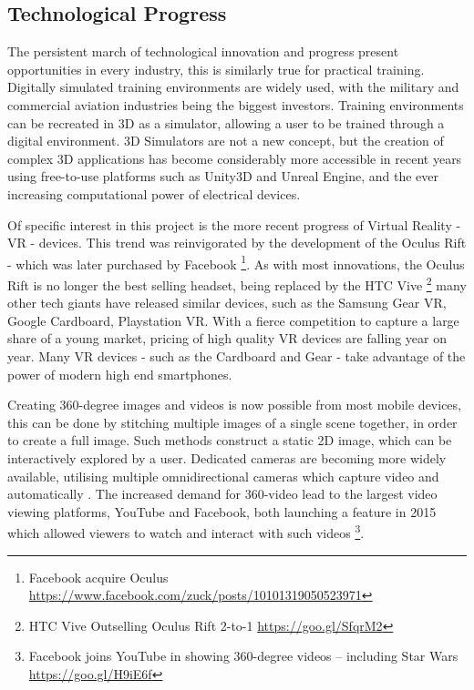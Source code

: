 \documentclass[ %
                    author={Elis Jones},
                supervisor={Dr. Kirsten Cater},
                    degree={BSc},
                     title={The Effect of Presentation Medium on Spatial Cognition},
                  subtitle={in the Virtual Environment},
                      year={2018} ]{dissertation}
\begin{document}
\subsection{Technological Progress} \label{tech_progress}
The persistent march of technological innovation and progress present opportunities in every  industry, this is similarly true for practical training. Digitally simulated training environments are widely used, with the military and commercial aviation industries being the biggest investors. Training environments can be recreated in 3D as a simulator, allowing a user to be trained through a digital environment. 3D Simulators are not a new concept, but the creation of complex 3D applications has become considerably more accessible in recent years using free-to-use platforms such as Unity3D and Unreal Engine, and the ever increasing computational power of electrical devices. 

Of specific interest in this project is the more recent progress of Virtual Reality - VR - devices. This trend was reinvigorated by the development of the Oculus Rift - which was later purchased by Facebook \footnote{Facebook acquire Oculus \url{https://www.facebook.com/zuck/posts/10101319050523971}}. As with most innovations, the Oculus Rift is no longer the best selling headset, being replaced by the HTC Vive \footnote{HTC Vive Outselling Oculus Rift 2-to-1 \url{https://goo.gl/SfqrM2}} many other tech giants have released similar devices, such as the Samsung Gear VR, Google Cardboard, Playstation VR. With a fierce competition to capture a large share of a young market, pricing of high quality VR devices are falling year on year. Many VR devices - such as the Cardboard and Gear - take advantage of the power of modern high end smartphones. 

Creating 360-degree images and videos is now possible from most mobile devices, this can be done by stitching multiple images of a single scene together, in order to create a full image. Such methods construct a static 2D image, which can be interactively explored by a user. Dedicated cameras are becoming more widely available, utilising multiple omnidirectional cameras which capture video and automatically . The increased demand for 360-video lead to the largest video viewing platforms, YouTube and Facebook, both launching a feature in 2015 which allowed viewers to watch and interact with such videos \footnote{Facebook joins YouTube in showing 360-degree videos – including Star Wars \url{https://goo.gl/H9iE6f}}. 
\end{document}
